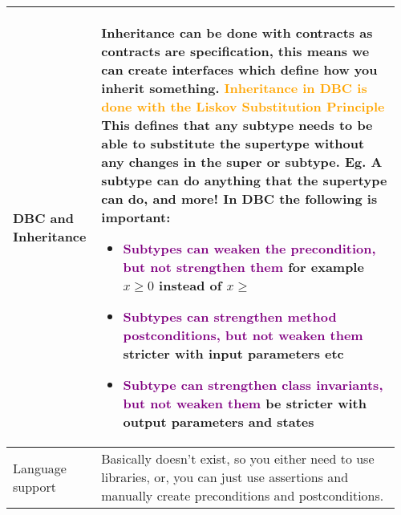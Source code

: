 \documentclass[main.tex,fontsize=8pt,paper=a4,paper=portrait,DIV=calc,]{scrartcl}
\begin{document}
\pagebreak
\begin{table}[ht!]
\begin{tabular}{|m{0.2\linewidth}|m{0.755\linewidth}|}
\hline
DBC and Inheritance & 
Inheritance can be done with contracts as contracts are \textbf{specification}, this means we can create interfaces which define how you inherit something.\newline
\textcolor{orange}{Inheritance in DBC is done with the \textbf{Liskov Substitution Principle}}\newline
\textbf{This defines that any subtype needs to be able to substitute the supertype without any changes in the super or subtype.}\newline
Eg. A subtype can do anything that the supertype can do, \textbf{and more!}\newline
In DBC the following is important: \newline
\begin{itemize}
\item \textcolor{purple}{Subtypes can weaken the precondition, but not strengthen them}\newline
  for example \(x \ge 0\) instead of \(x \geq \)
\item \textcolor{purple}{Subtypes can strengthen method postconditions, but not weaken them}\newline
  stricter with input parameters etc
\item \textcolor{purple}{Subtype can strengthen class invariants, but not weaken them}\newline
  be stricter with output parameters and states
\vspace{-3mm}
\end{itemize}\\ 
\hline
Language support & 
Basically doesn't exist, so you either need to use libraries, or, you can just use assertions and manually create preconditions and postconditions.\\
\hline
\end{tabular}
\end{table}
\end{document}
